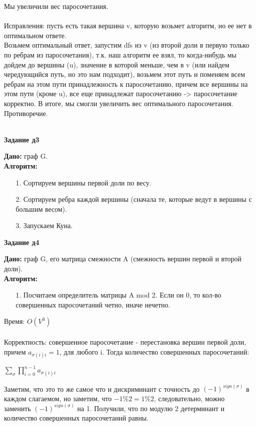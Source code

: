 \documentclass[12pt]{article} %
\begin{document}
				  Мы увеличили вес паросочетания.\\
	\\
	Исправления: пусть есть такая вершина v, которую возьмет алгоритм, но ее нет в оптимальном ответе.\\
	Возьмем оптимальный ответ, запустим dfs из v (из второй доли в первую только по ребрам из паросочетания), т.к. наш алгоритм ее взял,
	то когда-нибудь мы дойдем до вершины (u), значение в которой меньше, чем в v (или найдем чередующийся путь, но это нам подходит),
	возьмем этот путь и поменяем всем ребрам на этом пути принадлежность к паросочетанию, причем все вершины на этом пути (кроме u),
	все еще принадлежат паросочетанию -> паросочетание корректно. В итоге, мы смогли увеличить вес оптимального паросочетания. Противоречие.\\
	\\
	\begin{center}
		\textbf{Задание д3}\\
	\end{center}
	\textbf{Дано:} граф G.\\
	\textbf{Алгоритм:}\\
	\begin{enumerate}
		\item[1.] Сортируем вершины первой доли по весу.
		\item[2.] Сортируем ребра каждой вершины (сначала те, которые ведут в вершины с большим весом).
		\item[3.] Запускаем Куна.
	\end{enumerate}
	\begin{center}
		\textbf{Задание д4}\\
	\end{center}
	\textbf{Дано:} граф G, его матрица смежности A (смежность вершин первой и второй доли).\\
	\textbf{Алгоритм:}\\
	\begin{enumerate}
		\item[1.] Посчитаем определитель матрицы A mod 2. Если он 0, то кол-во совершенных паросочетаний четно, иначе нечетно.
	\end{enumerate}
	Время: $O(V^3)$\\
	\\
	Корректность: совершенное паросочетание - перестановка вершин первой доли, причем $a_{\sigma(i)i} = 1$, для любого i. Тогда количество совершенных паросочетаний: \\
	\begin{center}
		$\sum_{\sigma}{\prod_{i = 0}^{n - 1}{a_{\sigma(i)i}}}$\\
	\end{center}
	Заметим, что это то же самое что и дискриминант с точность до $(-1)^{sign(\sigma)}$ в каждом слагаемом, но заметим, что $-1 \% 2 = 1 \% 2$, следовательно, можно заменить  $(-1)^{sign(\sigma)}$ на 1. Получили, что по модулю 2 детерминант и количество совершенных паросочетаний равны.\\
\end{document}
